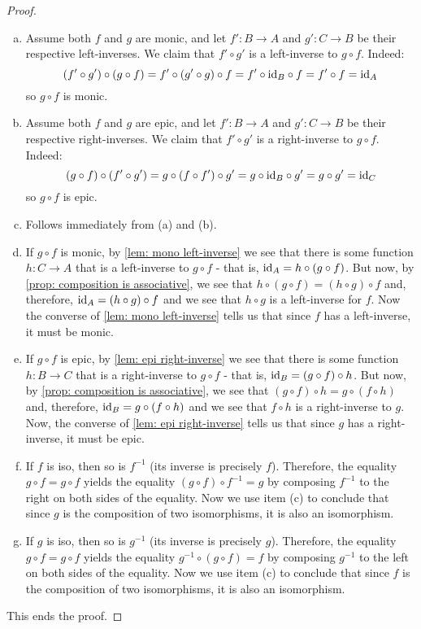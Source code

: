\begin{proof}
	\begin{enumerate}[(a)]
		\item Assume both $f$ and $g$ are monic, and let $f':B\to A$ and $g':C\to B$ be their respective left-inverses. We claim that $f'\circ g'$ is a left-inverse to $g\circ f$. Indeed:
		\[(f'\circ g')\circ(g\circ f)=f'\circ(g'\circ g)\circ f=f'\circ{\rm id}_B\circ f=f'\circ f={\rm id}_A\]so $g\circ f$ is monic.
		
		\item Assume both $f$ and $g$ are epic, and let $f':B\to A$ and $g':C\to B$ be their respective right-inverses. We claim that $f'\circ g'$ is a right-inverse to $g\circ f$. Indeed:
		\[(g\circ f)\circ(f'\circ g')=g\circ(f\circ f')\circ g'=g\circ{\rm id}_B\circ g'=g\circ g'={\rm id}_C\]so $g\circ f$ is epic.
		
		\item Follows immediately from (a) and (b).
		
		\item If $g\circ f$ is monic, by \cref{lem: mono left-inverse} we see that there is some function $h:C\to A$ that is a left-inverse to $g\circ f$ - that is, ${\rm id}_A=h\circ(g\circ f)$. But now, by \cref{prop: composition is associative}, we see that $h\circ(g\circ f)=(h\circ g)\circ f$ and, therefore, ${\rm id}_A=(h\circ g)\circ f$ and we see that $h\circ g$ is a left-inverse for $f$. Now the converse of \cref{lem: mono left-inverse} tells us that since $f$ has a left-inverse, it must be monic.
		
		\item If $g\circ f$ is epic, by \cref{lem: epi right-inverse} we see that there is some function $h:B\to C$ that is a right-inverse to $g\circ f$ - that is, ${\rm id}_B=(g\circ f)\circ h$. But now, by \cref{prop: composition is associative}, we see that $(g\circ f)\circ h=g\circ(f\circ h)$ and, therefore, ${\rm id}_B=g\circ(f\circ h)$ and we see that $f\circ h$ is a right-inverse to $g$. Now, the converse of \cref{lem: epi right-inverse} tells us that since $g$ has a right-inverse, it must be epic.
		
		\item If $f$ is iso, then so is $f^{-1}$ (its inverse is precisely $f$). Therefore, the equality $g\circ f=g\circ f$ yields the equality $(g\circ f)\circ f^{-1}=g$ by composing $f^{-1}$ to the right on both sides of the equality. Now we use item (c) to conclude that since $g$ is the composition of two isomorphisms, it is also an isomorphism.
		
		\item If $g$ is iso, then so is $g^{-1}$ (its inverse is precisely $g$). Therefore, the equality $g\circ f=g\circ f$ yields the equality $g^{-1}\circ(g\circ f)=f$ by composing $g^{-1}$ to the left on both sides of the equality. Now we use item (c) to conclude that since $f$ is the composition of two isomorphisms, it is also an isomorphism.
	\end{enumerate}

This ends the proof.
\end{proof}

